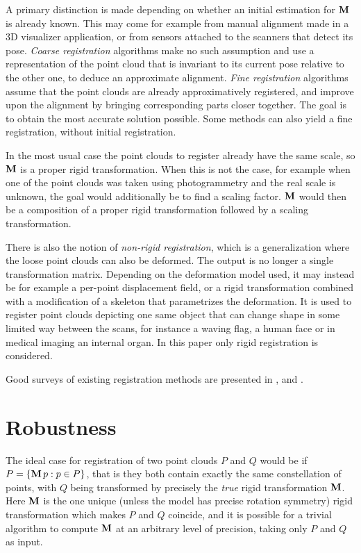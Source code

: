 A primary distinction is made depending on whether an initial estimation for $\mathbf{M}$ is already known. This may come for example from manual alignment made in a 3D visualizer application, or from sensors attached to the scanners that detect its pose. \emph{Coarse registration} algorithms make no such assumption and use a representation of the point cloud that is invariant to its current pose relative to the other one, to deduce an approximate alignment. \emph{Fine registration} algorithms assume that the point clouds are already approximatively registered, and improve upon the alignment by bringing corresponding parts closer together. The goal is to obtain the most accurate solution possible. Some methods can also yield a fine registration, without initial registration.

In the most usual case the point clouds to register already have the same scale, so $\mathbf{M}$ is a proper rigid transformation. When this is not the case, for example when one of the point clouds was taken using photogrammetry and the real scale is unknown, the goal would additionally be to find a scaling factor. $\mathbf{M}$ would then be a composition of a proper rigid transformation followed by a scaling transformation.

There is also the notion of \emph{non-rigid registration}, which is a generalization where the loose point clouds can also be deformed. The output is no longer a single transformation matrix. Depending on the deformation model used, it may instead be for example a per-point displacement field, or a rigid transformation combined with a modification of a skeleton that parametrizes the deformation. It is used to register point clouds depicting one same object that can change shape in some limited way between the scans, for instance a waving flag, a human face or in medical imaging an internal organ. In this paper only rigid registration is considered.

Good surveys of existing registration methods are presented in \cite{Salv2006}, \cite{Tam2007} and \cite{Bell2014}.


\section{Robustness} \label{sec:registration_robostness}
The ideal case for registration of two point clouds $P$ and $Q$ would be if $P = \{ \mathbf{M} \, p : p \in P \}$, that is they both contain exactly the same constellation of points, with $Q$ being transformed by precisely the \emph{true} rigid transformation $\mathbf{M}$. Here $\mathbf{M}$ is the one unique (unless the model has precise rotation symmetry) rigid transformation which makes $P$ and $Q$ coincide, and it is possible for a trivial algorithm to compute $\mathbf{M}$ at an arbitrary level of precision, taking only $P$ and $Q$ as input.

